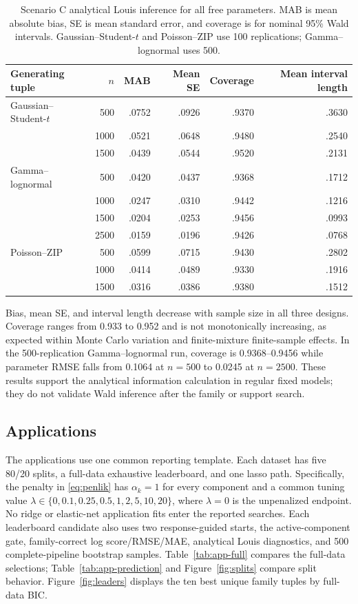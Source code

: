 \documentclass[a4paper,fleqn]{cas-sc}
\begin{document}
\begin{table}[t]
\centering
\caption{Scenario C analytical Louis inference for all free parameters. MAB is mean absolute bias, SE is mean standard error, and coverage is for nominal 95\% Wald intervals. Gaussian--Student-$t$ and Poisson--ZIP use 100 replications; Gamma--lognormal uses 500.}
\label{tab:sim-inference}
\small
\begin{tabular}{lrrrrr}
\toprule
Generating tuple & $n$ & MAB & Mean SE & Coverage & Mean interval length \\
\midrule
Gaussian--Student-$t$ & 500  & .0752 & .0926 & .9370 & .3630 \\
 & 1000 & .0521 & .0648 & .9480 & .2540 \\
 & 1500 & .0439 & .0544 & .9520 & .2131 \\
Gamma--lognormal & 500  & .0420 & .0437 & .9368 & .1712 \\
 & 1000 & .0247 & .0310 & .9442 & .1216 \\
 & 1500 & .0204 & .0253 & .9456 & .0993 \\
 & 2500 & .0159 & .0196 & .9426 & .0768 \\
Poisson--ZIP & 500  & .0599 & .0715 & .9430 & .2802 \\
 & 1000 & .0414 & .0489 & .9330 & .1916 \\
 & 1500 & .0316 & .0386 & .9380 & .1512 \\
\bottomrule
\end{tabular}
\end{table}

Bias, mean SE, and interval length decrease with sample size in all three designs. Coverage ranges from 0.933 to 0.952 and is not monotonically increasing, as expected within Monte Carlo variation and finite-mixture finite-sample effects. In the 500-replication Gamma--lognormal run, coverage is 0.9368--0.9456 while parameter RMSE falls from 0.1064 at $n=500$ to 0.0245 at $n=2500$. These results support the analytical information calculation in regular fixed models; they do not validate Wald inference after the family or support search.

\subsection{Applications}
\label{sec:applications}

The applications use one common reporting template. Each dataset has five 80/20 splits, a full-data exhaustive leaderboard, and one lasso path. Specifically, the penalty in \eqref{eq:penlik} has $\alpha_k=1$ for every component and a common tuning value $\lambda\in\{0,0.1,0.25,0.5,1,2,5,10,20\}$, where $\lambda=0$ is the unpenalized endpoint. No ridge or elastic-net application fits enter the reported searches. Each leaderboard candidate also uses two response-guided starts, the active-component gate, family-correct log score/RMSE/MAE, analytical Louis diagnostics, and 500 complete-pipeline bootstrap samples. Table~\ref{tab:app-full} compares the full-data selections; Table~\ref{tab:app-prediction} and Figure~\ref{fig:splits} compare split behavior. Figure~\ref{fig:leaders} displays the ten best unique family tuples by full-data BIC.
\end{document}
